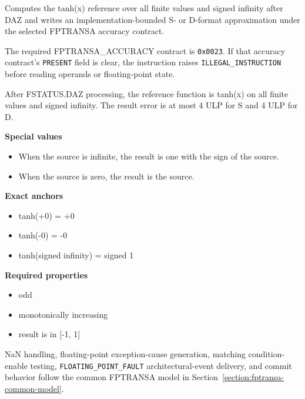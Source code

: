 Computes the tanh(x) reference over all finite values and signed infinity after DAZ and writes an implementation-bounded S- or D-format approximation under the selected FPTRANSA accuracy contract.

The required FPTRANSA\_ACCURACY contract is \texttt{0x0023}. If that accuracy contract's \texttt{PRESENT} field is clear, the instruction raises \texttt{ILLEGAL\_INSTRUCTION} before reading operands or floating-point state.

After FSTATUS.DAZ processing, the reference function is tanh(x) on all finite values and signed infinity. The result error is at most 4 ULP for S and 4 ULP for D.

\textbf{Special values}\par
\begin{itemize}
\item When the source is infinite, the result is one with the sign of the source.
\item When the source is zero, the result is the source.
\end{itemize}

\textbf{Exact anchors}\par
\begin{itemize}
\item tanh(+0) = +0
\item tanh(-0) = -0
\item tanh(signed infinity) = signed 1
\end{itemize}

\textbf{Required properties}\par
\begin{itemize}
\item odd
\item monotonically increasing
\item result is in [-1, 1]
\end{itemize}

NaN handling, floating-point exception-cause generation, matching condition-enable testing, \texttt{FLOATING\_POINT\_FAULT} architectural-event delivery, and commit behavior follow the common FPTRANSA model in Section~\ref{section:fptransa-common-model}.
